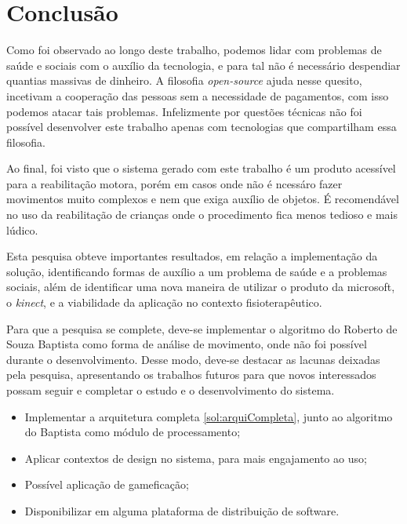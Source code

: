\chapter[Conclusão]{Conclusão}\label{ch:conclusao}
  Como foi observado ao longo deste trabalho, podemos lidar com problemas de saúde e sociais com o auxílio da tecnologia,
e para tal não é necessário despendiar quantias massivas de dinheiro. A filosofia \textit{open-source} ajuda nesse quesito, incetivam a cooperação das pessoas
sem a necessidade de pagamentos, com isso podemos atacar tais problemas. Infelizmente por questões  técnicas não foi possível desenvolver este trabalho apenas com
tecnologias que compartilham essa filosofia.

  Ao final, foi visto que o sistema gerado com este trabalho é um produto acessível para a reabilitação motora, porém em casos onde não é ncessáro
fazer movimentos muito complexos e nem que exiga auxílio de objetos. É recomendável no uso da reabilitação de crianças onde o procedimento
fica menos tedioso e mais lúdico.

Esta pesquisa obteve importantes resultados, em relação a implementação da solução, identificando
formas de auxílio a um problema de saúde e a problemas sociais, além de identificar uma nova maneira de utilizar o produto da microsoft, o
\textit{kinect}, e a viabilidade da aplicação no
contexto fisioterapêutico.

Para que a pesquisa se complete, deve-se implementar o algoritmo do Roberto de Souza Baptista \cite{roberto} como forma
de análise de movimento, onde não foi possível durante o desenvolvimento. Desse modo, deve-se destacar as lacunas
deixadas pela pesquisa, apresentando os trabalhos futuros para que novos interessados
possam seguir e completar o estudo e o desenvolvimento do sistema.
\begin{itemize}
  \item Implementar a arquitetura completa \ref{sol:arquiCompleta}, junto ao algoritmo do Baptista \cite{roberto} como módulo de processamento;
  \item Aplicar contextos de design no sistema, para mais engajamento ao uso;
  \item Possível aplicação de gameficação;
  \item Disponibilizar em alguma plataforma de distribuição de software.
\end{itemize}
